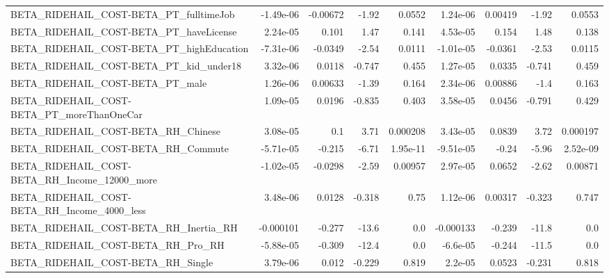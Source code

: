 \begin{tabular}{lrrrrrrrr}
BETA\_RIDEHAIL\_COST-BETA\_PT\_fulltimeJob             &   -1.49e-06 &     -0.00672 &    -1.92 &   0.0552 &   1.24e-06 &     0.00419 &        -1.92 &        0.0553 \\
BETA\_RIDEHAIL\_COST-BETA\_PT\_haveLicense             &    2.24e-05 &        0.101 &     1.47 &    0.141 &   4.53e-05 &       0.154 &         1.48 &         0.138 \\
BETA\_RIDEHAIL\_COST-BETA\_PT\_highEducation           &   -7.31e-06 &      -0.0349 &    -2.54 &   0.0111 &  -1.01e-05 &     -0.0361 &        -2.53 &        0.0115 \\
BETA\_RIDEHAIL\_COST-BETA\_PT\_kid\_under18             &    3.32e-06 &       0.0118 &   -0.747 &    0.455 &   1.27e-05 &      0.0335 &       -0.741 &         0.459 \\
BETA\_RIDEHAIL\_COST-BETA\_PT\_male                    &    1.26e-06 &      0.00633 &    -1.39 &    0.164 &   2.34e-06 &     0.00886 &         -1.4 &         0.163 \\
BETA\_RIDEHAIL\_COST-BETA\_PT\_moreThanOneCar          &    1.09e-05 &       0.0196 &   -0.835 &    0.403 &   3.58e-05 &      0.0456 &       -0.791 &         0.429 \\
BETA\_RIDEHAIL\_COST-BETA\_RH\_Chinese                 &    3.08e-05 &          0.1 &     3.71 & 0.000208 &   3.43e-05 &      0.0839 &         3.72 &      0.000197 \\
BETA\_RIDEHAIL\_COST-BETA\_RH\_Commute                 &   -5.71e-05 &       -0.215 &    -6.71 & 1.95e-11 &  -9.51e-05 &       -0.24 &        -5.96 &      2.52e-09 \\
BETA\_RIDEHAIL\_COST-BETA\_RH\_Income\_12000\_more       &   -1.02e-05 &      -0.0298 &    -2.59 &  0.00957 &   2.97e-05 &      0.0652 &        -2.62 &       0.00871 \\
BETA\_RIDEHAIL\_COST-BETA\_RH\_Income\_4000\_less        &    3.48e-06 &       0.0128 &   -0.318 &     0.75 &   1.12e-06 &     0.00317 &       -0.323 &         0.747 \\
BETA\_RIDEHAIL\_COST-BETA\_RH\_Inertia\_RH              &   -0.000101 &       -0.277 &    -13.6 &      0.0 &  -0.000133 &      -0.239 &        -11.8 &           0.0 \\
BETA\_RIDEHAIL\_COST-BETA\_RH\_Pro\_RH                  &   -5.88e-05 &       -0.309 &    -12.4 &      0.0 &   -6.6e-05 &      -0.244 &        -11.5 &           0.0 \\
BETA\_RIDEHAIL\_COST-BETA\_RH\_Single                  &    3.79e-06 &        0.012 &   -0.229 &    0.819 &    2.2e-05 &      0.0523 &       -0.231 &         0.818 \\

\end{tabular}
